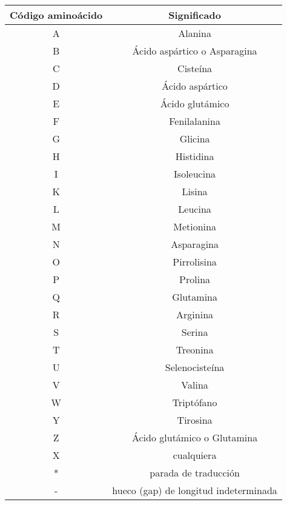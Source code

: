 \documentclass[12pt,a4paper,spanish]{article}
\begin{document}
\begin{itemize}
					\begin{center}
						\begin{tabular}{| c | c |}
							\hline
							{\bf Código aminoácido} & {\bf Significado} \\
							\hline
							\hline		
							A &	Alanina \\\hline
							B & Ácido aspártico o Asparagina \\\hline
							C &	Cisteína \\\hline
							D &	Ácido aspártico \\\hline
							E &	Ácido glutámico \\\hline
							F &	Fenilalanina \\\hline
							G &	Glicina \\\hline
							H &	Histidina \\\hline
							I & Isoleucina \\\hline
							K &	Lisina \\\hline
							L &	Leucina \\\hline
							M & Metionina \\\hline
							N &	Asparagina \\\hline
							O &	Pirrolisina \\\hline
							P &	Prolina \\\hline
							Q &	Glutamina \\\hline
							R &	Arginina \\\hline
							S &	Serina \\\hline
							T &	Treonina \\\hline
							U &	Selenocisteína \\\hline
							V &	Valina \\\hline
							W &	Triptófano \\\hline
							Y &	Tirosina \\\hline
							Z &	Ácido glutámico o Glutamina \\\hline
							X &	cualquiera \\\hline
							* &	parada de traducción \\\hline
							- &	hueco (gap) de longitud indeterminada \\\hline
						\end{tabular}
					\end{center}	
			 \end{itemize}
\end{document}
